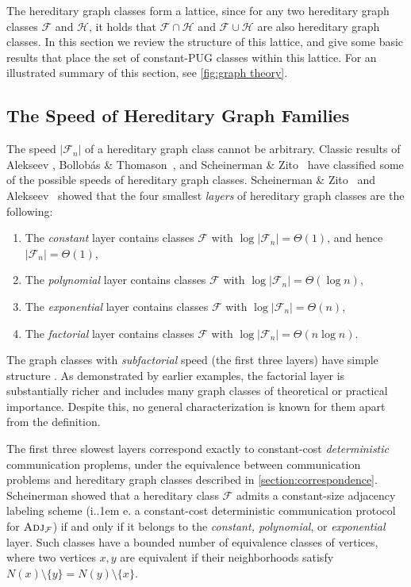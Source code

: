 \documentclass{theoretics}
\makeatletter
\newcommand{\cF}{\ensuremath{\mathcal{F}}}
\newcommand{\cH}{\ensuremath{\mathcal{H}}}
\newcommand{\Adj}{\textsc{Adj}}
\newcommand*\ie{i.\kern.1em e.\@\xspace} %
\makeatother
\begin{document}
The hereditary graph classes form a lattice, since for any two hereditary graph classes $\cF$ and $\cH$,
it holds that $\cF \cap \cH$ and $\cF \cup \cH$ are also hereditary graph classes.  In this section we
review the structure of this lattice, and give some basic results that place the set of constant-PUG
classes within this lattice.  For an illustrated summary of this section, see \cref{fig:graph
theory}.

\subsection{The Speed of Hereditary Graph Families}
\label{section:appendix-speed}

The speed $|\cF_n|$ of a hereditary graph class cannot be arbitrary. Classic results of Alekseev
\cite{Ale92,Ale97}, Bollob{\'a}s \& Thomason~\cite{BT95}, and Scheinerman \& Zito~\cite{SZ94} have
classified some of the possible speeds of hereditary graph classes. Scheinerman \& Zito~\cite{SZ94}
and Alekseev~\cite{Ale97} showed that the four smallest \emph{layers} of hereditary graph classes
are the following:

\begin{enumerate}
	\item The \emph{constant} layer contains classes $\cF$ with $\log |\cF_n| = \Theta(1)$, and hence $|\cF_n| = \Theta(1)$,
	\item The \emph{polynomial} layer contains classes $\cF$ with $\log |\cF_n| = \Theta(\log n)$,
	\item The \emph{exponential} layer contains classes $\cF$ with $\log |\cF_n| = \Theta(n)$,
	\item The \emph{factorial} layer contains classes $\cF$ with $\log |\cF_n| = \Theta(n\log n)$.
\end{enumerate}
The graph classes with \emph{subfactorial} speed (the first three layers) have simple structure
\cite{SZ94,Ale97}. As demonstrated by earlier examples, the factorial layer is substantially richer and
includes many graph classes of theoretical or practical importance. Despite this, no general
characterization is known for them apart from the definition.

The first three slowest layers correspond exactly to constant-cost \emph{deterministic}
communication proplems, under the equivalence between communication problems and hereditary graph
classes described in \cref{section:correspondence}. Scheinerman \cite{Sch99} showed that a
hereditary class $\cF$ admits a constant-size adjacency labeling scheme (\ie a constant-cost
deterministic communication protocol for $\Adj_\cF$) if and only if it belongs to the
\emph{constant, polynomial}, or \emph{exponential} layer.  Such classes have a bounded number of
equivalence classes of vertices, where two vertices $x,y$ are equivalent if their neighborhoods
satisfy $N(x) \setminus \{y\} = N(y) \setminus \{x\}$.  
\end{document}
